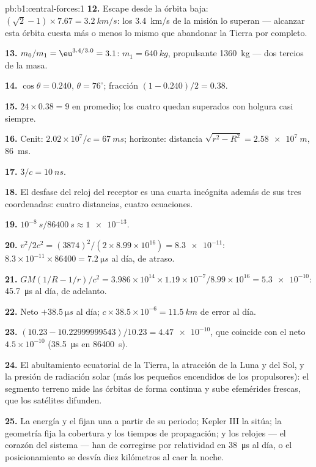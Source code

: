 \begin{solution}{pb:b1:central-forces:1}
\textbf{12.} Escape desde la órbita baja: $(\sqrt2 - 1)\times 7.67 = \qty{3.2}{km/s}$:
los \qty{3.4}{km/s} de la misión lo superan --- alcanzar esta órbita cuesta
más o menos lo mismo que abandonar la Tierra por completo.

\textbf{13.} $m_0/m_1 = \eu^{3.4/3.0} = 3.1$: $m_1 = \qty{640}{kg}$,
propulsante \qty{1360}{kg} --- dos tercios de la masa.

\textbf{14.} $\cos\theta = 0.240$, $\theta = 76^\circ$; fracción $(1 - 0.240)/2
= 0.38$.

\textbf{15.} $24 \times 0.38 = 9$ en promedio; los cuatro quedan superados
con holgura casi siempre.

\textbf{16.} Cenit: $2.02\times10^7/c = \qty{67}{ms}$; horizonte: distancia
$\sqrt{r^2 - R^2} = \qty{2.58e7}{m}$, \qty{86}{ms}.

\textbf{17.} $3/c = \qty{10}{ns}$.

\textbf{18.} El desfase del reloj del receptor es una cuarta incógnita
además de sus tres coordenadas: cuatro distancias, cuatro ecuaciones.

\textbf{19.} $10^{-8}\ \unit{s}/\qty{86400}{s} \approx \num{1e-13}$.

\textbf{20.} $v^2/2c^2 = (3874)^2/(2 \times 8.99\times10^{16}) = \num{8.3e-11}$:
$8.3\times10^{-11} \times 86400 = \qty{7.2}{\micro s}$ al día, de atraso.

\textbf{21.} $GM(1/R - 1/r)/c^2 = 3.986\times10^{14} \times 1.19\times10^{-7}/
8.99\times10^{16} = \num{5.3e-10}$: \qty{45.7}{\micro s} al día, de adelanto.

\textbf{22.} Neto $+\qty{38.5}{\micro s}$ al día; $c \times 38.5\times10^{-6}
= \qty{11.5}{km}$ de error al día.

\textbf{23.} $(10.23 - 10.22999999543)/10.23 = \num{4.47e-10}$, que coincide
con el neto $4.5\times10^{-10}$ (\qty{38.5}{\micro s} en \qty{86400}{s}).

\textbf{24.} El abultamiento ecuatorial de la Tierra, la atracción de la
Luna y del Sol, y la presión de radiación solar (más los pequeños
encendidos de los propulsores): el segmento terreno mide las órbitas de
forma continua y sube efemérides frescas, que los satélites difunden.

\textbf{25.} La energía y el  fijan una  a
partir de su periodo; Kepler III la sitúa; la geometría fija la cobertura
y los tiempos de propagación; y los relojes --- el corazón del sistema ---
han de corregirse por relatividad en \qty{38}{\micro s} al día, o el
posicionamiento se desvía diez kilómetros al caer la noche.
\end{solution}
